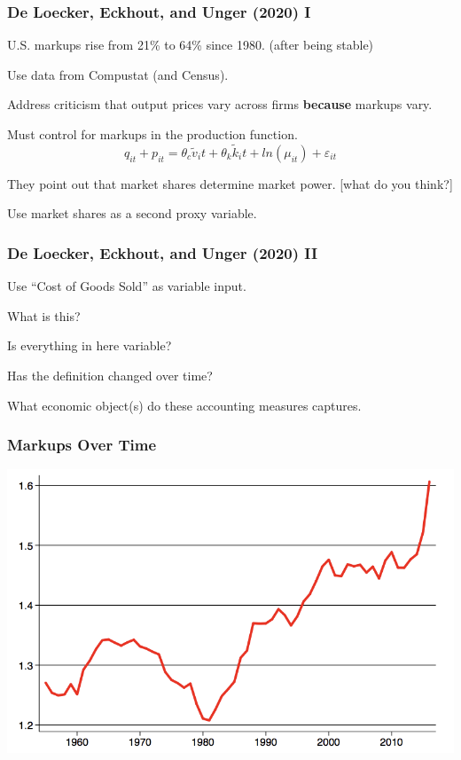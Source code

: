 \documentclass[11pt, aspectratio=169]{beamer}
\newenvironment{wideitemize}{\itemize\addtolength{\itemsep}{10pt}}{\enditemize}
\begin{document}
\begin{frame}[c]\frametitle{De Loecker, Eckhout, and Unger (2020) I}

\begin{wideitemize}
	\item U.S. markups rise from 21\% to 64\% since 1980. (after being stable)
	\item Use data from Compustat (and Census). 
	\item Address criticism that output prices vary across firms \textbf{because} markups vary. 
	\begin{wideitemize}
		\item Must control for markups in the production function.
		$$q_{it} + p_{it} = \theta_c \tilde{v}_it + \theta_k \tilde{k}_it + ln(\mu_{it}) + \varepsilon_{it}$$		
	\end{wideitemize}
	\item They point out that market shares determine market power. [what do you think?]
	\item Use market shares as a second proxy variable.
\end{wideitemize}
    
\end{frame}


\begin{frame}[c]\frametitle{De Loecker, Eckhout, and Unger (2020) II}
	\begin{wideitemize}
	       	\item Use ``Cost of Goods Sold'' as variable input. 
	       	\item What is this? 
	       	\begin{wideitemize}
	       	 	\item Is everything in here variable?
	       	 	\item Has the definition changed over time?
	       	 \end{wideitemize}	 
	       	 \item What economic object(s) do these accounting measures captures.	       	       	
	\end{wideitemize}	                      
\end{frame}    


\begin{frame}[c]\frametitle{Markups Over Time}
    \centering
    \includegraphics[scale=.7]{DLE1.png}


\end{frame}
\end{document}
